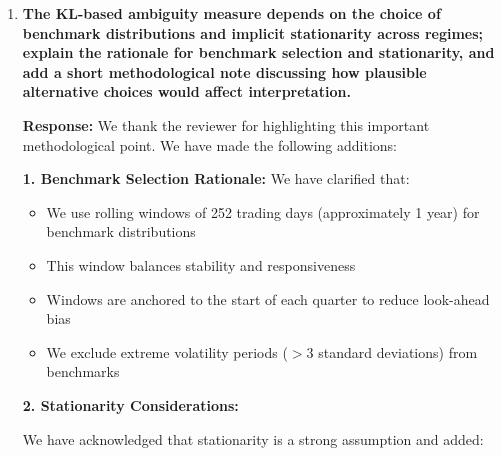 \documentclass[12pt]{article}
\begin{document}
\begin{enumerate}
\begin{responsebox}
    \vspace{0.5cm}

    Beyond the mediation framework, we have reinforced identification with complementary checks: an instrumental-variable design using Non-Asian GPR shocks, placebo tests using non-geopolitical macro headlines, and sensitivity analyses across control sets (market, VIX, rates). Bootstrap confidence intervals and Newey–West inference further ensure robust estimation in the presence of short-run serial correlation. These additions clarify the assumptions, timing, and empirical evidence consistent with the intended causal pathway.
    
    \end{responsebox}

    \vspace{0.5cm}

    \item \textbf{The KL-based ambiguity measure depends on the choice of benchmark distributions and implicit stationarity across regimes; explain the rationale for benchmark selection and stationarity, and add a short methodological note discussing how plausible alternative choices would affect interpretation.}

    \begin{responsebox}
    \vspace{0.5cm}
    \textbf{Response:} We thank the reviewer for highlighting this important methodological point. We have made the following additions:
    \vspace{0.5cm}

    \textbf{1. Benchmark Selection Rationale:} We have clarified that:  
    \begin{itemize}
        \item We use rolling windows of 252 trading days (approximately 1 year) for benchmark distributions
        \item This window balances stability and responsiveness
        \item Windows are anchored to the start of each quarter to reduce look-ahead bias
        \item We exclude extreme volatility periods ($>3$ standard deviations) from benchmarks
    \end{itemize}

    \textbf{2. Stationarity Considerations:}

    \vspace{0.5cm}
    We have acknowledged that stationarity is a strong assumption and added:
    

\end{responsebox}
\end{enumerate}
\end{document}

